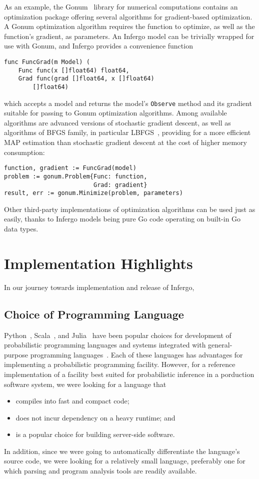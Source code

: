 \documentclass[sigplan,review,10pt,anonymous]{acmart}
\begin{document}
\begin{sloppypar}
As an example, the Gonum~\cite{Gonum} library for numerical
computations contains an optimization package offering several
algorithms for gradient-based optimization. A Gonum optimization
algorithm requires the function to optimize, as well as the
function's gradient, as parameters. An Infergo model can be
trivially wrapped for use with Gonum, and Infergo provides a
convenience function
\begin{lstlisting}
func FuncGrad(m Model) (
	Func func(x []float64) float64,
	Grad func(grad []float64, x []float64)
		[]float64)
\end{lstlisting}
which accepts a model and returns the model's
\lstinline{Observe} method and its gradient suitable for passing
to Gonum optimization algorithms. Among available algorithms are
advanced versions of stochastic gradient descent, as well as
algorithms of BFGS family, in particular LBFGS~\cite{LN89},
providing for a more efficient MAP estimation than stochastic
gradient descent at the cost of higher memory consumption:
\begin{lstlisting}
function, gradient := FuncGrad(model)
problem := gonum.Problem{Func: function, 
                         Grad: gradient}
result, err := gonum.Minimize(problem, parameters)
\end{lstlisting}

Other third-party implementations of optimization algorithms can
be used just as easily, thanks to Infergo models being pure Go
code operating on built-in Go data types.

\section{Implementation Highlights}

In our journey towards implementation and release of Infergo, 

\subsection{Choice of Programming Language}

Python~\cite{Python95}, Scala~\cite{Scala06}, and
Julia~\cite{Julia14} have been popular choices for development
of probabilistic programming languages and systems integrated
with general-purpose programming
languages~\cite{S16,MMW18,BCJ+19,P09,Rainier,GXG18,ISF+18}.
Each of these languages has advantages for implementing a
probabilistic programming facility. However, for a reference
implementation of a facility best suited for probabilistic
inference in a porduction software system, we were looking
for a language that \begin{itemize}
	\item compiles into fast and compact code;
	\item does not incur dependency on a heavy runtime; and
	\item is a popular choice for building server-side software.
\end{itemize}
In addition, since we were going to automatically differentiate
the language's source code, we were looking for a relatively
small language, preferably one for which parsing and program
analysis tools are readily available. 


\end{sloppypar}
\end{document}
